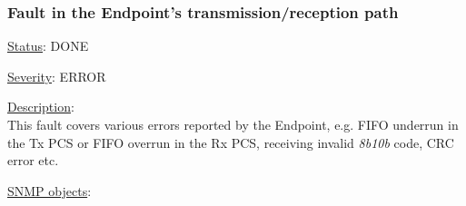 \subsubsection{\bf Fault in the Endpoint's transmission/reception path}
		\label{fail:data:ep_txrx}
		\begin{packed_enum}
			\item [] \underline{Status}: DONE
			\item [] \underline{Severity}: ERROR
			\item [] \underline{Description}:\\
				This fault covers various errors reported by the Endpoint, e.g. FIFO
				underrun in the Tx PCS or FIFO overrun in the Rx PCS, receiving invalid
				\emph{8b10b} code, CRC error etc.
			\item [] \underline{SNMP objects}:\\
				\\
				\\
				\\
				\\
				\\
				\\
				\\
		\end{packed_enum}

